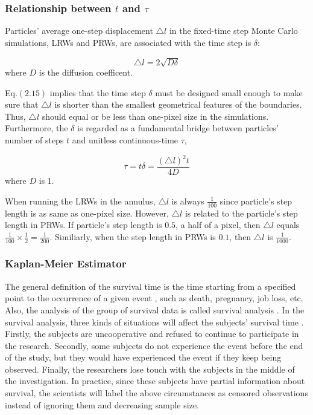 \subsubsection{Relationship between $t$ and $\tau$}

Particles' average one-step displacement $\triangle l$ in the
fixed-time step Monte Carlo simulations, LRWs and PRWs, are associated
with the time step is $\delta$:

\begin{equation}
  \triangle l = 2 \sqrt{D \delta}
\end{equation}
where $D$ is the diffusion coefficent.

Eq.$(2.15)$ implies that the time step $\delta$ must be designed small
enough to make sure that $\triangle l$ is shorter than the smallest
geometrical features of the boundaries. Thus, $\triangle l$ should
equal or be less than one-pixel size in the simulations. Furthermore,
the $\delta$ is regarded as a fundamental bridge between particles'
number of steps $t$ and unitless continuous-time $\tau$,

\begin{equation}
 \tau = t \delta = \frac{(\triangle l)^2 t}{4D}
\end{equation}
where $D$ is 1.

When running the LRWs in the annulus, $\triangle l$ is always
$\frac{1}{100}$ since particle's step length is as same as one-pixel
size. However, $\triangle l$ is related to the particle's step length
in PRWs. If particle's step length is $0.5$, a half of a pixel, then
$\triangle l$ equals $\frac{1}{100} \times \frac{1}{2} =
\frac{1}{200}$.  Similiarly, when the step length in PRWs is $0.1$,
then $\triangle l$ is $\frac{1}{1000}$. 


\subsubsection{Kaplan-Meier Estimator}

The general definition of the survival time is the time starting from
a specified point to the occurrence of a given event
\cite{bewick2004statistics}, such as death, pregnancy, job loss,
etc. Also, the analysis of the group of survival data is called
survival analysis \cite{altman1990practical}. In the survival
analysis, three kinds of situations will affect the subjects' survival
time \cite{goel2010understanding}. Firstly, the subjects are
uncooperative and refused to continue to participate in the
research. Secondly, some subjects do not experience the event before
the end of the study, but they would have experienced the event if
they keep being observed. Finally, the researchers lose touch with the
subjects in the middle of the investigation. In practice, since these
subjects have partial information about survival, the scientists will
label the above circumstances as censored observations
\cite{bewick2004statistics} instead of ignoring them and decreasing
sample size. 

